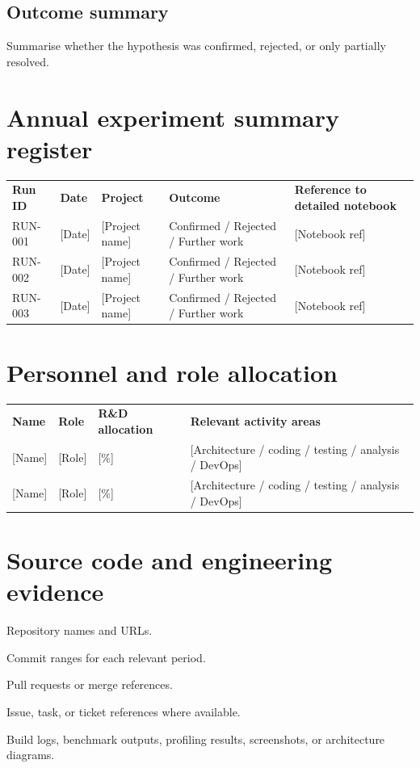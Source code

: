\documentclass[11pt]{article}
\begin{document}
\subsection{Outcome summary}
Summarise whether the hypothesis was confirmed, rejected, or only partially resolved.

\section{Annual experiment summary register}
\begin{xltabular}{\textwidth}{L{2.1cm}L{2.4cm}L{3.1cm}L{2.5cm}Y}
\textbf{Run ID} & \textbf{Date} & \textbf{Project} & \textbf{Outcome} & \textbf{Reference to detailed notebook} \\
RUN-001 & {[Date]} & {[Project name]} & Confirmed / Rejected / Further work & {[Notebook ref]} \\
RUN-002 & {[Date]} & {[Project name]} & Confirmed / Rejected / Further work & {[Notebook ref]} \\
RUN-003 & {[Date]} & {[Project name]} & Confirmed / Rejected / Further work & {[Notebook ref]} \\
\end{xltabular}

\section{Personnel and role allocation}
\begin{xltabular}{\textwidth}{L{3.5cm}L{3cm}L{3cm}Y}
\textbf{Name} & \textbf{Role} & \textbf{R\&D allocation} & \textbf{Relevant activity areas} \\
{[Name]} & {[Role]} & {[\%]} & {[Architecture / coding / testing / analysis / DevOps]} \\
{[Name]} & {[Role]} & {[\%]} & {[Architecture / coding / testing / analysis / DevOps]} \\
\end{xltabular}

\section{Source code and engineering evidence}
\begin{RDChecklist}
\item Repository names and URLs.
\item Commit ranges for each relevant period.
\item Pull requests or merge references.
\item Issue, task, or ticket references where available.
\item Build logs, benchmark outputs, profiling results, screenshots, or architecture diagrams.
\end{RDChecklist}
\end{document}
